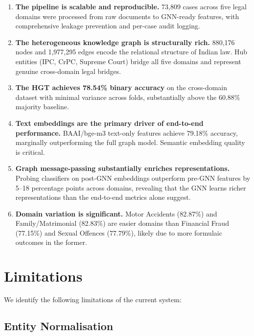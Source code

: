\documentclass[12pt,a4paper]{report}
\begin{document}
\begin{enumerate}
  \item \textbf{The pipeline is scalable and reproducible.} 73,809 cases across five legal domains were processed from raw documents to GNN-ready features, with comprehensive leakage prevention and per-case audit logging.

  \item \textbf{The heterogeneous knowledge graph is structurally rich.} 880,176 nodes and 1,977,295 edges encode the relational structure of Indian law. Hub entities (IPC, CrPC, Supreme Court) bridge all five domains and represent genuine cross-domain legal bridges.

  \item \textbf{The HGT achieves 78.54\% binary accuracy} on the cross-domain dataset with minimal variance across folds, substantially above the 60.88\% majority baseline.

  \item \textbf{Text embeddings are the primary driver of end-to-end performance.} BAAI/bge-m3 text-only features achieve 79.18\% accuracy, marginally outperforming the full graph model. Semantic embedding quality is critical.

  \item \textbf{Graph message-passing substantially enriches representations.} Probing classifiers on post-GNN embeddings outperform pre-GNN features by 5--18 percentage points across domains, revealing that the GNN learns richer representations than the end-to-end metrics alone suggest.

  \item \textbf{Domain variation is significant.} Motor Accidents (82.87\%) and Family/Matrimonial (82.83\%) are easier domains than Financial Fraud (77.15\%) and Sexual Offences (77.79\%), likely due to more formulaic outcomes in the former.
\end{enumerate}

\section{Limitations}
\label{sec:limitations}

We identify the following limitations of the current system:

\subsection{Entity Normalisation}
\end{document}
